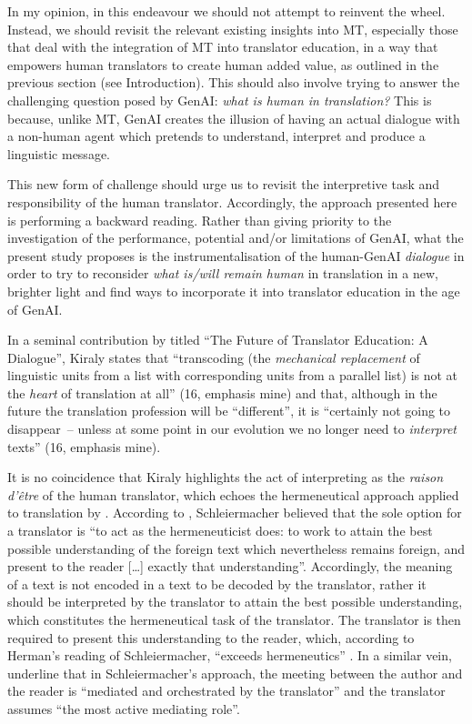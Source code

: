 \documentclass[output=paper,colorlinks,citecolor=brown]{langscibook}
\begin{document}
In my opinion, in this endeavour we should not attempt to reinvent the wheel. Instead, we should revisit the relevant existing insights into MT, especially those that deal with the integration of MT into translator education, in a way that empowers human translators to create human added value, as outlined in the previous section (see Introduction). This should also involve trying to answer the challenging question posed by GenAI: \textit{what is human in translation?} This is because, unlike MT, GenAI creates the illusion of having an actual dialogue with a non-human agent which pretends to understand, interpret and produce a linguistic message.

This new form of challenge should urge us to revisit the interpretive task and responsibility of the human translator. Accordingly, the approach presented here is performing a backward reading. Rather than giving priority to the investigation of the performance, potential and/or limitations of GenAI, what the present study proposes is the instrumentalisation of the human-GenAI \textit{dialogue} in order to try to reconsider \textit{what is/will remain human} in translation in a new, brighter light and find ways to incorporate it into translator education in the age of GenAI.

In a seminal contribution by \citet{MasseyKıraly} titled “The Future of Translator Education: A Dialogue”, Kiraly states that “transcoding (the \textit{mechanical replacement} of linguistic units from a list with corresponding units from a parallel list) is not at the \textit{heart} of translation at all” (16, emphasis mine) and that, although in the future the translation profession will be “different”, it is “certainly not going to disappear~-- unless at some point in our evolution we no longer need to \textit{interpret} texts” (16, emphasis mine).

It is no coincidence that Kiraly highlights the act of interpreting as the \textit{raison d’être} of the human translator, which echoes the hermeneutical approach applied to translation by \citet{schleiermacher1813}. According to \citet[101--102]{Hermans2015}, Schleiermacher believed that the sole option for a translator is “to act as the hermeneuticist does: to work to attain the best possible understanding of the foreign text which nevertheless remains foreign, and present to the reader […] exactly that understanding”. Accordingly, the meaning of a text is not encoded in a text to be decoded by the translator, rather it should be interpreted by the translator to attain the best possible understanding, which constitutes the hermeneutical task of the translator. The translator is then required to present this understanding to the reader, which, according to Herman’s reading of Schleiermacher, “exceeds hermeneutics” \citep[99]{Hermans2015}. In a similar vein, \citet[295]{Serban2016} underline that in Schleiermacher’s approach, the meeting between the author and the reader is “mediated and orchestrated by the translator” and the translator assumes “the most active mediating role”.
\end{document}

